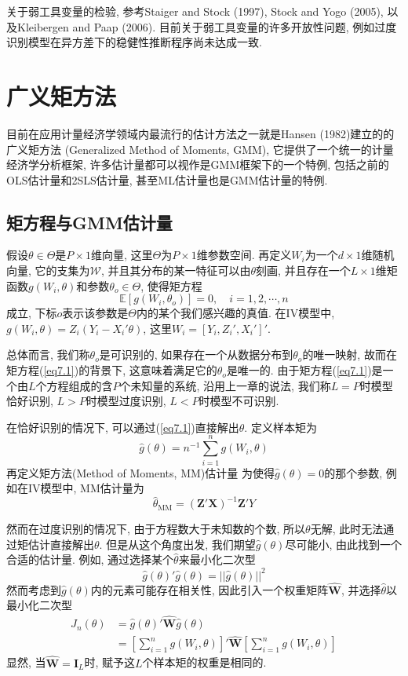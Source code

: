 \documentclass[cn, 12pt, math=mtpro2, bibstyle=apa, blue, twocol]{elegantbook}
\newcommand{\E}{\mathbb{E}}
\newcommand{\W}{\mathbold{W}}
\newcommand{\X}{\mathbold{X}}
\newcommand{\Z}{\mathbold{Z}}
\begin{document}
关于弱工具变量的检验, 参考Staiger and Stock (1997), Stock and Yogo (2005), 以及Kleibergen and Paap (2006). 目前关于弱工具变量的许多开放性问题, 例如过度识别模型在异方差下的稳健性推断程序尚未达成一致.

\chapter{广义矩方法}
目前在应用计量经济学领域内最流行的估计方法之一就是Hansen (1982)建立的的广义矩方法 (Generalized Method of Moments, GMM), 它提供了一个统一的计量经济学分析框架, 许多估计量都可以视作是GMM框架下的一个特例, 包括之前的OLS估计量和2SLS估计量, 甚至ML估计量也是GMM估计量的特例.
\section{矩方程与GMM估计量}
假设$\theta \in \Theta$是$P\times1$维向量, 这里$\Theta$为$P\times1$维参数空间. 再定义$W_i$为一个$d\times1$维随机向量, 它的支集为$\mathscr{W}$, 并且其分布的某一特征可以由$\theta$刻画, 并且存在一个$L\times1$维矩函数$g(W_i,\theta)$和参数$\theta_o\in\Theta$, 使得矩方程
\begin{equation}\label{eq7.1}
  \E[g(W_i,\theta_o)]=0,\quad i=1,2,\cdots,n
\end{equation}
成立, 下标$o$表示该参数是$\Theta$内的某个我们感兴趣的真值. 在IV模型中, $g(W_i,\theta)=Z_i(Y_i-X_i'\theta)$, 这里$W_i=[Y_i,Z_i',X_i']'$.

总体而言, 我们称$\theta_o$是可识别的, 如果存在一个从数据分布到$\theta_o$的唯一映射, 故而在矩方程(\ref{eq7.1})的背景下, 这意味着满足它的$\theta_o$是唯一的. 由于矩方程(\ref{eq7.1})是一个由$L$个方程组成的含$P$个未知量的系统, 沿用上一章的说法, 我们称$L=P$时模型恰好识别, $L>P$时模型过度识别, $L<P$时模型不可识别.

在恰好识别的情况下, 可以通过(\ref{eq7.1})直接解出$\theta$. 定义样本矩为
$$\hat{g}(\theta)=n^{-1}\sum_{i=1}^{n}g(W_i,\theta)$$
再定义矩方法(Method of Moments, MM)估计量 为使得$\hat{g}(\theta)=0$的那个参数, 例如在IV模型中, MM估计量为
$$\hat{\theta}_{{\text{MM}}}=(\Z'\X)^{-1}\Z'Y$$

然而在过度识别的情况下, 由于方程数大于未知数的个数, 所以$\theta$无解, 此时无法通过矩估计直接解出$\theta$. 但是从这个角度出发, 我们期望$\hat{g}(\theta)$尽可能小, 由此找到一个合适的估计量. 例如, 通过选择某个$\hat{\theta}$来最小化二次型
$$\hat{g}(\theta)'\hat{g}(\theta)=||\hat{g}(\theta)||^2$$
然而考虑到$\hat{g}(\theta)$内的元素可能存在相关性, 因此引入一个权重矩阵$\hat{\W}$, 并选择$\hat{\theta}$以最小化二次型
\begin{align*}
J_n(\theta)&=\hat{g}(\theta)'\hat{\W}\hat{g}(\theta) \\
&=\left[\sum_{i=1}^{n}g(W_i,\theta)\right]'\hat{\W}\left[\sum_{i=1}^{n}g(W_i,\theta)\right]
\end{align*}
显然, 当$\hat{\W}=\mathbold{I}_L$时, 赋予这$L$个样本矩的权重是相同的.
\end{document}
